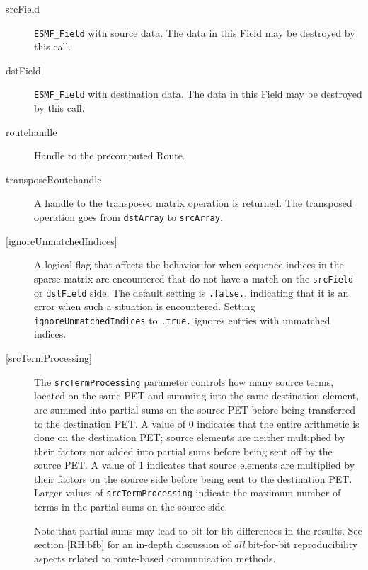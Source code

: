    \begin{description}
  
   \item [srcField]
         {\tt ESMF\_Field} with source data. The data in this Field may be
       destroyed by this call.
  
   \item [dstField]
         {\tt ESMF\_Field} with destination data. The data in this Field may be
       destroyed by this call.
  
   \item [routehandle]
         Handle to the precomputed Route.
  
   \item [transposeRoutehandle]
       A handle to the transposed matrix operation is returned. The
       transposed operation goes from {\tt dstArray} to {\tt srcArray}.
       
     \item [{[ignoreUnmatchedIndices]}]
       A logical flag that affects the behavior for when sequence indices 
       in the sparse matrix are encountered that do not have a match on the 
       {\tt srcField} or {\tt dstField} side. The default setting is 
       {\tt .false.}, indicating that it is an error when such a situation is 
       encountered. Setting {\tt ignoreUnmatchedIndices} to {\tt .true.} ignores
       entries with unmatched indices.
  
     \item [{[srcTermProcessing]}]
       The {\tt srcTermProcessing} parameter controls how many source terms,
       located on the same PET and summing into the same destination element,
       are summed into partial sums on the source PET before being transferred
       to the destination PET. A value of 0 indicates that the entire arithmetic
       is done on the destination PET; source elements are neither multiplied
       by their factors nor added into partial sums before being sent off by the
       source PET. A value of 1 indicates that source elements are multiplied
       by their factors on the source side before being sent to the destination
       PET. Larger values of {\tt srcTermProcessing} indicate the maximum number
       of terms in the partial sums on the source side.
  
       Note that partial sums may lead to bit-for-bit differences in the results.
       See section \ref{RH:bfb} for an in-depth discussion of {\em all}
       bit-for-bit reproducibility aspects related to route-based communication
       methods.
  

\end{description}
